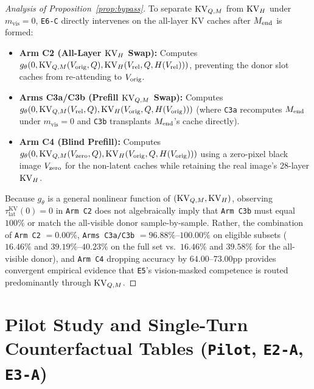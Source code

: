 \begin{proof}[Analysis of Proposition~\ref{prop:bypass}]
To separate $\mathrm{KV}_{Q,M}$ from $\mathrm{KV}_H$ under $m_{\mathrm{vis}} = 0$, \texttt{E6-C} directly intervenes on the all-layer KV caches after $M_{\mathrm{end}}$ is formed:
\begin{itemize}
    \item \textbf{Arm C2 (All-Layer $\mathrm{KV}_H$ Swap):} Computes $g_\theta(0, \mathrm{KV}_{Q,M}(V_{\mathrm{orig}}, Q), \mathrm{KV}_H(V_{\mathrm{rel}}, Q, H(V_{\mathrm{rel}})))$, preventing the donor slot caches from re-attending to $V_{\mathrm{orig}}$.
    \item \textbf{Arms C3a/C3b (Prefill $\mathrm{KV}_{Q,M}$ Swap):} Computes $g_\theta(0, \mathrm{KV}_{Q,M}(V_{\mathrm{rel}}, Q), \mathrm{KV}_H(V_{\mathrm{orig}}, Q, H(V_{\mathrm{orig}})))$ (where \texttt{C3a} recomputes $M_{\mathrm{end}}$ under $m_{\mathrm{vis}}=0$ and \texttt{C3b} transplants $M_{\mathrm{end}}$'s cache directly).
    \item \textbf{Arm C4 (Blind Prefill):} Computes $g_\theta(0, \mathrm{KV}_{Q,M}(V_{\mathrm{zero}}, Q), \mathrm{KV}_H(V_{\mathrm{orig}}, Q, H(V_{\mathrm{orig}})))$ using a zero-pixel black image $V_{\mathrm{zero}}$ for the non-latent caches while retaining the real image's 28-layer $\mathrm{KV}_H$.
\end{itemize}
Because $g_\theta$ is a general nonlinear function of $(\mathrm{KV}_{Q,M}, \mathrm{KV}_H)$, observing $\tau_{\mathrm{lat}}^{\mathrm{KV}}(0) = 0$ in \texttt{Arm C2} does not algebraically imply that \texttt{Arm C3b} must equal $100\%$ or match the all-visible donor sample-by-sample. Rather, the combination of \texttt{Arm C2} $= 0.00\%$, \texttt{Arms C3a/C3b} $= 96.88\%$--$100.00\%$ on eligible subsets ($16.46\%$ and $39.19\%$--$40.23\%$ on the full set vs.\ $16.46\%$ and $39.58\%$ for the all-visible donor), and \texttt{Arm C4} dropping accuracy by $64.00$--$73.00$pp provides convergent empirical evidence that \texttt{E5}'s vision-masked competence is routed predominantly through $\mathrm{KV}_{Q,M}$.
\end{proof}

\section{Pilot Study and Single-Turn Counterfactual Tables (\texttt{Pilot}, \texttt{E2-A}, \texttt{E3-A})}
\label{app:pilot_e2_e3a}

